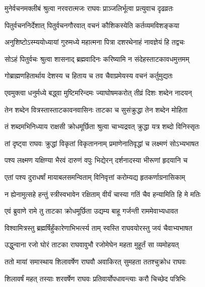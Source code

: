 
\twolineshloka
{मुनेर्वचनमक्लीबं श्रुत्वा नरवरात्मजः}
{राघवः प्राञ्जलिर्भूत्वा प्रत्युवाच दृढव्रतः} %

\twolineshloka
{पितुर्वचननिर्देशात् पितुर्वचनगौरवात्}
{वचनं कौशिकस्येति कर्तव्यमविशङ्कया} %

\twolineshloka
{अनुशिष्टोऽस्म्ययोध्यायां गुरुमध्ये महात्मना}
{पित्रा दशरथेनाहं नावज्ञेयं हि तद्वचः} %

\twolineshloka
{सोऽहं पितुर्वचः श्रुत्वा शासनाद् ब्रह्मवादिनः}
{करिष्यामि न संदेहस्ताटकावधमुत्तमम्} %

\twolineshloka
{गोब्राह्मणहितार्थाय देशस्य च हिताय च}
{तव चैवाप्रमेयस्य वचनं कर्तुमुद्यतः} %

\twolineshloka
{एवमुक्त्वा धनुर्मध्ये बद्ध्वा मुष्टिमरिन्दमः}
{ज्याघोषमकरोत् तीव्रं दिशः शब्देन नादयन्} %

\twolineshloka
{तेन शब्देन वित्रस्तास्ताटकावनवासिनः}
{ताटका च सुसंक्रुद्धा तेन शब्देन मोहिता} %

\twolineshloka
{तं शब्दमभिनिध्याय राक्षसी क्रोधमूर्छिता}
{श्रुत्वा चाभ्यद्रवत् क्रुद्धा यत्र शब्दो विनिस्सृतः} %

\twolineshloka
{तां दृष्ट्वा राघवः क्रुद्धां विकृतां विकृताननाम्}
{प्रमाणेनातिवृद्धां च लक्ष्मणं सोऽभ्यभाषत} %

\twolineshloka
{पश्य लक्ष्मण यक्षिण्या भैरवं दारुणं वपुः}
{भिद्येरन् दर्शनादस्या भीरूणां हृदयानि च} %

\twolineshloka
{एतां पश्य दुराधर्षां मायाबलसमन्विताम्}
{विनिवृत्तां करोम्यद्य हृतकर्णाग्रनासिकाम्} %

\twolineshloka
{न ह्येनामुत्सहे हन्तुं स्त्रीस्वभावेन रक्षिताम्}
{वीर्यं चास्या गतिं चैव हन्यामिति हि मे मतिः} %

\twolineshloka
{एवं ब्रुवाणे रामे तु ताटका क्रोधमूर्छिता}
{उद्यम्य बाहू गर्जन्ती राममेवाभ्यधावत} %

\twolineshloka
{विश्वामित्रस्तु ब्रह्मर्षिर्हुंकारेणाभिभर्त्स्य ताम्}
{स्वस्ति राघवयोरस्तु जयं चैवाभ्यभाषत} %

\twolineshloka
{उद्धुन्वाना रजो घोरं ताटका राघवावुभौ}
{रजोमेघेन महता मुहूर्तं सा व्यमोहयत्} %

\twolineshloka
{ततो मायां समास्थाय शिलावर्षेण राघवौ}
{अवाकिरत् सुमहता ततश्चुक्रोध राघवः} %

\twolineshloka
{शिलावर्षं महत् तस्याः शरवर्षेण राघवः}
{प्रतिवार्योपधावन्त्याः करौ चिच्छेद पत्रिभिः} %

